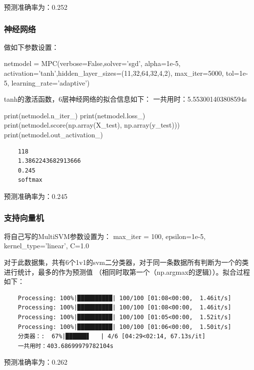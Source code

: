 \documentclass[UTF8,a4paper,AutoFakeBold,AutoFakeSlant]{article}
\begin{document}
预测准确率为：0.252


\subsubsection{神经网络}

做如下参数设置：
\begin{python}
  netmodel = MPC(verbose=False,solver='sgd', alpha=1e-5, activation='tanh',hidden_layer_sizes=(11,32,64,32,4,2), max_iter=5000, tol=1e-5, learning_rate='adaptive')
\end{python}
tanh的激活函数，6层神经网络的拟合信息如下：
一共用时：5.553001403808594s
\begin{python}
  print(netmodel.n_iter_)
  print(netmodel.loss_)
  print(netmodel.score(np.array(X_test), np.array(y_test)))
  print(netmodel.out_activation_)
\end{python}
\begin{mdframed}[hidealllines=true,backgroundcolor=shadecolor]
  \begin{verbatim}
    118
    1.3862243682913666
    0.245
    softmax
  \end{verbatim}
\end{mdframed}

预测准确率为：0.245


\subsubsection{支持向量机}

将自己写的MultiSVM参数设置为：
max\_iter = 100, epsilon=1e-5, kernel\_type='linear', C=1.0

对于此数据集，共有6个1v1的svm二分类器，对于同一条数据所有判断为一个的类进行统计，最多的作为预测值
（相同时取第一个（np.argmax的逻辑））。拟合过程如下：

\begin{mdframed}[hidealllines=true,backgroundcolor=shadecolor]
  \begin{verbatim}
    Processing: 100%|██████████| 100/100 [01:08<00:00,  1.46it/s]
    Processing: 100%|██████████| 100/100 [01:08<00:00,  1.46it/s]
    Processing: 100%|██████████| 100/100 [01:05<00:00,  1.52it/s]
    Processing: 100%|██████████| 100/100 [01:06<00:00,  1.50it/s]
    分类器：:  67%|██████▋   | 4/6 [04:29<02:14, 67.13s/it]
    一共用时：403.68699979782104s
  \end{verbatim}
\end{mdframed}

预测准确率为：0.262
\end{document}
